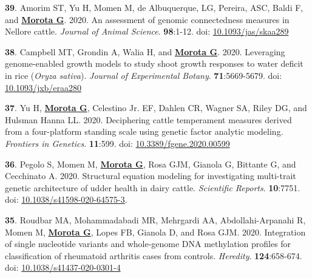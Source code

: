 \documentclass[margin,line,10pt]{res}
\newenvironment{list1}{
  \begin{list}{\ding{113}}{%
      \setlength{\itemsep}{0in}
      \setlength{\parsep}{0in} \setlength{\parskip}{0in}
      \setlength{\topsep}{0in} \setlength{\partopsep}{0in} 
      \setlength{\leftmargin}{0.17in}}}{\end{list}}
\begin{document}
\begin{resume}
\begin{list1}
\item [{\bf 39}.] Amorim ST, Yu H, Momen M, de Albuquerque, LG, Pereira, ASC, Baldi F, and \textbf{\underline{Morota G}}. 2020. An assessment of genomic connectedness measures in Nellore cattle. \emph{Journal of Animal Science}.  \textbf{98}:1-12.  doi: \textcolor{blue}{\href{https://doi.org/10.1093/jas/skaa289}{10.1093/jas/skaa289}} 

  \vspace{0.5cm}

\item  [{\bf 38}.]  Campbell MT, Grondin A, Walia H, and \textbf{\underline{Morota G}}. 2020. Leveraging genome-enabled growth models to study shoot growth responses to water deficit in rice ({\it Oryza sativa}). \emph{Journal of Experimental Botany}. \textbf{71}:5669-5679. doi: \textcolor{blue}{\href{https://doi.org/10.1093/jxb/eraa280}{10.1093/jxb/eraa280}}

    \vspace{0.5cm}
    
\item [{\bf 37}.] Yu H, \textbf{\underline{Morota G}}, Celestino Jr. EF, Dahlen CR, Wagner SA, Riley DG, and Hulsman Hanna LL. 2020. Deciphering cattle temperament measures derived from a four-platform standing scale using genetic factor analytic modeling. \emph{Frontiers in Genetics}. \textbf{11}:599. doi: \textcolor{blue}{\href{https://doi.org/10.3389/fgene.2020.00599}{10.3389/fgene.2020.00599}}

  \vspace{0.5cm}

    
\item [{\bf 36}.] Pegolo S, Momen M, \textbf{\underline{Morota G}}, Rosa GJM, Gianola G, Bittante G, and Cecchinato A. 2020. Structural equation modeling for investigating multi-trait genetic architecture of udder health in dairy cattle. \emph{Scientific Reports}. \textbf{10}:7751. doi: \textcolor{blue}{\href{https://doi.org/10.1038/s41598-020-64575-3}{10.1038/s41598-020-64575-3}}. 

  \vspace{0.5cm}

\item  [{\bf 35}.] Roudbar MA, Mohammadabadi MR, Mehrgardi AA, Abdollahi-Arpanahi R,  Momen M, \textbf{\underline{Morota G}}, Lopes FB, Gianola D, and Rosa GJM. 2020. Integration of single nucleotide variants and whole-genome DNA methylation profiles for classification of rheumatoid arthritis cases from controls. \emph{Heredity}. \textbf{124}:658-674. doi: \textcolor{blue}{\href{https://doi.org/10.1038/s41437-020-0301-4}{10.1038/s41437-020-0301-4}} 
  

\end{list1}
\end{resume}
\end{document}

